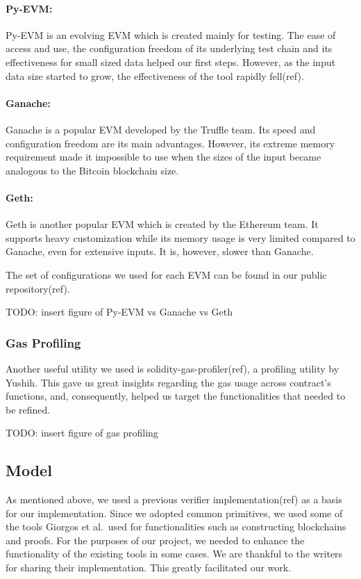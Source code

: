 \paragraph {Py-EVM:} Py-EVM is an evolving EVM which is created mainly for
testing. The ease of access and use, the configuration freedom of its
underlying test chain and its effectiveness for small sized data helped our
first steps. However, as the input data size started to grow, the effectiveness
of the tool rapidly fell(ref).

\paragraph {Ganache:} Ganache is a popular EVM developed by the Truffle team.
Its speed and configuration freedom are its main advantages. However, its
extreme memory requirement made it impossible to use when the sizes of the
input became analogous to the Bitcoin blockchain size.

\paragraph {Geth:} Geth is another popular EVM which is created by the Ethereum
team. It supports heavy customization while its memory usage is very limited
compared to Ganache, even for extensive inputs. It is, however, slower than
Ganache.

The set of configurations we used for each EVM can be found in our
public repository(ref).

TODO: insert figure of Py-EVM vs Ganache vs Geth

\subsubsection{Gas Profiling}

Another useful utility we used is solidity-gas-profiler(ref), a profiling
utility by Yushih. This gave us great insights regarding the gas usage across
contract’s functions, and, consequently, helped us target the functionalities
that needed to be refined.

TODO: insert figure of gas profiling

\subsection{Model}

As mentioned above, we used a previous verifier implementation(ref) as a basis
for our implementation. Since we adopted common primitives, we used some of the
tools Giorgos et al.\ used for functionalities such as constructing blockchains
and proofs. For the purposes of our project, we needed to enhance the
functionality of the existing tools in some cases. We are thankful to the
writers for sharing their implementation. This greatly facilitated our work.

